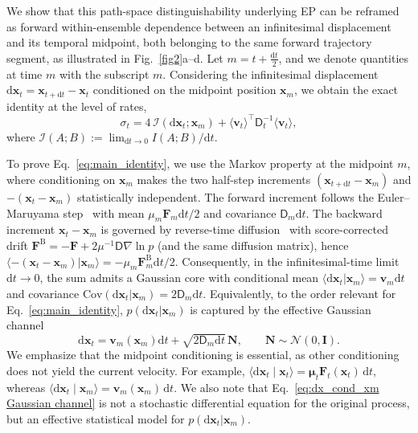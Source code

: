 \documentclass[
 longbibliography,
 twocolumn,
 superscriptaddress,
 amsmath,
 amssymb,
 amsthm,
 amsfonts,
 prl,
 floatfix,
]{revtex4-2}
\newcommand{\matbf}[1]{\boldsymbol{\mathsf{#1}}}
\begin{document}
We show that this path-space distinguishability underlying EP can be reframed as forward within-ensemble dependence between an infinitesimal displacement and its temporal midpoint, both belonging to the same forward trajectory segment, as illustrated in Fig.~\ref{fig2}a--d.
Let $m=t+\frac{\mathrm{d}t}{2}$, and we denote quantities at time $m$ with the subscript $m$. Considering the infinitesimal displacement $\mathrm d\bm{x}_t = \bm{x}_{t+\mathrm{d}t} - \bm{x}_t$ conditioned on the midpoint position $\bm{x}_m$, we obtain the exact identity at the level of rates,
\begin{equation}
    \sigma_t
    = 4\,\mathcal I(\mathrm{d}\bm{x}_t;\bm{x}_m)
    + \langle \bm{v}_t \rangle^\intercal
      \matbf{D}_t^{-1}
      \langle \bm{v}_t \rangle ,
\label{eq:main_identity}
\end{equation}
where $\mathcal I(A;B) := \lim_{\mathrm{d}t\to 0} I(A;B)/\mathrm{d}t$.

To prove Eq.~\eqref{eq:main_identity}, we use the Markov property at the midpoint $m$, where conditioning on $\bm{x}_m$ makes the two half-step increments $(\bm{x}_{t+\mathrm{d}t}-\bm{x}_m)$ and $-(\bm{x}_t-\bm{x}_m)$ statistically independent. 
The forward increment follows the Euler--Maruyama step~\cite{maruyama1955continuous,kloeden1992numerical} with mean $\matbf{\mu}_m\bm{F}_m\mathrm{d}t/2$ and covariance $\matbf{D}_m\mathrm{d}t$. 
The backward increment $\bm{x}_t-\bm{x}_m$ is governed by reverse-time diffusion~\cite{anderson1982reverse, haussmann1986time} with score-corrected drift $\bm{F}^\mathrm{B}=-\bm{F}+2\matbf{\mu}^{-1}\matbf{D}\nabla\ln p$ (and the same diffusion matrix), hence $\langle-(\bm{x}_t-\bm{x}_m)|\bm{x}_m\rangle=-\matbf{\mu}_m\bm{F}^\mathrm{B}_m\mathrm{d}t/2$.
Consequently, in the infinitesimal-time limit $\mathrm{d}t\rightarrow0$, the sum admits a Gaussian core with conditional mean $\langle\mathrm{d}\bm{x}_t|\bm{x}_m\rangle=\bm{v}_m\mathrm{d}t$ and covariance $\mathrm{Cov}(\mathrm{d}\bm{x}_t|\bm{x}_m)=2\matbf{D}_m\mathrm{d}t$. Equivalently, to the order relevant for Eq.~\eqref{eq:main_identity}, $p(\mathrm d\bm x_t|\bm x_m)$ is captured by the effective Gaussian channel
\begin{equation}
    \mathrm{d}\bm{x}_t
    = \bm{v}_m(\bm{x}_m)\mathrm{d}t+\sqrt{2\matbf{D}_m\mathrm{d}t}\,\mathbf{N},
    \qquad \mathbf{N}\sim\mathcal{N}(0,\mathbf{I}).
\label{eq:dx_cond_xm Gaussian channel}
\end{equation}
We emphasize that the midpoint conditioning is essential, as other conditioning does not yield the current velocity. For example, $\langle \mathrm d\bm x_t \mid \bm x_t \rangle=\mathbf\mu_t\bm F_t(\bm x_t)\,\mathrm dt$, whereas $\langle \mathrm d\bm x_t \mid \bm x_m \rangle=\bm v_m(\bm x_m)\,\mathrm dt$.
We also note that Eq.~\eqref{eq:dx_cond_xm Gaussian channel} is not a stochastic differential equation for the original process, but an effective statistical model for $p(\mathrm{d}\bm{x}_t|\bm{x}_m)$.
\end{document}
